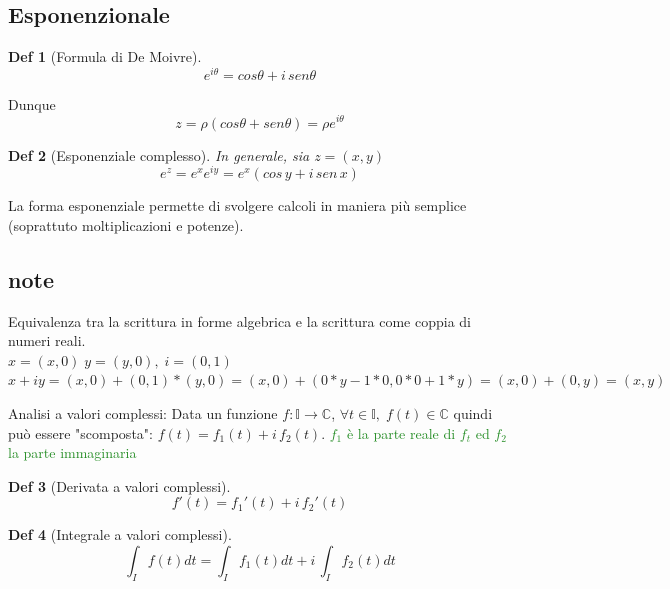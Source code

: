 \documentclass[a4paper]{article}
\newtheorem*{definition}{Def}
\newcommand{\appunto}[1]{\textcolor{ForestGreen}{#1}}
\newcommand{\C}[0]{\mathbb{C}}
\begin{document}
\subsection{Esponenzionale}
\begin{definition}[Formula di De Moivre]
	$$e^{i\theta} = cos\theta + i\, sen\theta$$
\end{definition}
Dunque
$$ z = \rho (cos \theta + sen \theta)=  \rho e^{i \theta}$$
\begin{definition}[Esponenziale complesso]
	In generale, sia $z = (x,y)$
	$$e^z = e^xe^{iy}=e^x(cos\,y + i \, sen\,x)$$
\end{definition}
La forma esponenziale permette di svolgere calcoli in maniera più semplice (soprattuto moltiplicazioni e potenze). 
\subsection{note}
Equivalenza tra la scrittura in forme algebrica e la scrittura come coppia di numeri reali.\\
$x = (x,0)\; y=(y,0),\; i=(0,1)$\\ 
$x+iy = (x,0) + (0,1)*(y,0) = (x,0) + (0*y - 1*0, 0*0 + 1*y ) = (x,0) + (0,y) = (x,y)$

Analisi a valori complessi:
Data un funzione $f: \mathbb{I} \rightarrow \C$,  $\forall t\in \mathbb{I},\; f(t)\in \C$
quindi può essere "scomposta": $f(t) = f_1(t) + i\,f_2(t)$.
\appunto{$f_1$ è la parte reale di $f_t$ ed $f_2$ la parte immaginaria}
\begin{definition}[Derivata a valori complessi]
	$$f'(t) = f_1'(t) + i\, f_2'(t)$$
\end{definition}
\begin{definition}[Integrale a valori complessi]
	$$\int_If(t) dt = \int_If_1(t) dt + i\, \int_If_2(t) dt$$
\end{definition}
\end{document}
